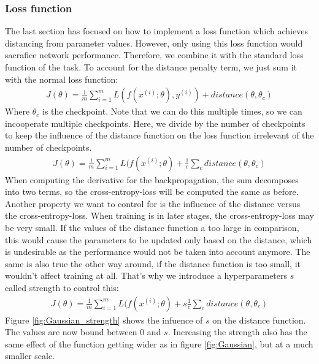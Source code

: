 \subsubsection{Loss function}\label{sub:Loss_function}
The last section has focused on how to implement a loss function which achieves
distancing from parameter values. However, only using this loss function would
sacrafice network performance. Therefore, we combine it with the standard loss
function of the task. To account for the distance penalty term, we just sum it with the normal loss function:
\begin{align}\label{eq:Loss_distance}
    J(\theta)=\frac{1}{m} \sum_{i=1}^m L(f(x^{(i)}; \theta), y^{(i)}) + distance(\theta, \theta_c)
\end{align}
Where $\theta_c$ is the checkpoint. Note that we can do this multiple times, so
we can incooperate multiple checkpoints. Here, we divide by the number of
checkpoints to keep the influence of the distance function on the loss function
irrelevant of the number of checkpoints.
\begin{align}
    J(\theta)=\frac{1}{m} \sum_{i=1}^m L(f(x^{(i)}; \theta) + \frac{1}{c} \sum_c distance(\theta, \theta_c)
\end{align}
When computing the derivative for the backpropagation, the sum
decomposes into two terms, so the cross-entropy-loss will be computed the same
as before. Another property we want to control for is the influence of the
distance versus the cross-entropy-loss. When training is in later stages, the
cross-entropy-loss may be very small. If the values of the distance function a
too large in comparison, this would cause the parameters to be updated only
based on the distance, which is undesirable as the performance would not be taken
into account anymore. The same is also true the other way around, if the
distance function is too small, it wouldn't affect training at all. That's why
we introduce a hyperparameters $s$ called strength to control this:
\begin{align}\label{eq:Loss_strength}
    J(\theta)=\frac{1}{m} \sum_{i=1}^m L(f(x^{(i)}; \theta) + s \frac{1}{c} \sum_c distance(\theta, \theta_c)
\end{align}
Figure \ref{fig:Gaussian_strength} shows the infuence of $s$ on the distance
function. The values are now bound between 0 and $s$. Increasing the strength
also has the same effect of the function getting wider as in figure
\ref{fig:Gaussian}, but at a much smaller scale. 


